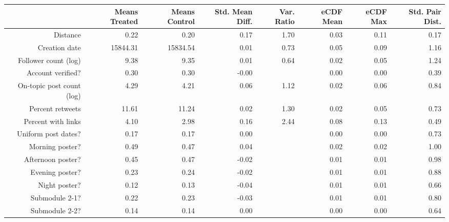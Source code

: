 \begin{table}[ht]
\centering
\begin{tabular}{rrrrrrrr}
  & Means Treated & Means Control & Std. Mean Diff. & Var. Ratio & eCDF Mean & eCDF Max & Std. Pair Dist. \\ 
  \hline
Distance & 0.22 & 0.20 & 0.17 & 1.70 & 0.03 & 0.11 & 0.17 \\ 
   \hline
Creation date & 15844.31 & 15834.54 & 0.01 & 0.73 & 0.05 & 0.09 & 1.16 \\ 
   \hline
Follower count (log) & 9.38 & 9.35 & 0.01 & 0.64 & 0.02 & 0.05 & 1.24 \\ 
   \hline
Account verified? & 0.30 & 0.30 & -0.00 &  & 0.00 & 0.00 & 0.39 \\ 
   \hline
On-topic post count (log) & 4.29 & 4.21 & 0.06 & 1.12 & 0.02 & 0.06 & 0.84 \\ 
   \hline
Percent retweets & 11.61 & 11.24 & 0.02 & 1.30 & 0.02 & 0.05 & 0.73 \\ 
   \hline
Percent with links & 4.10 & 2.98 & 0.16 & 2.44 & 0.08 & 0.13 & 0.49 \\ 
   \hline
Uniform post dates? & 0.17 & 0.17 & 0.00 &  & 0.00 & 0.00 & 0.73 \\ 
   \hline
Morning poster? & 0.49 & 0.47 & 0.04 &  & 0.02 & 0.02 & 1.00 \\ 
   \hline
Afternoon poster? & 0.45 & 0.47 & -0.02 &  & 0.01 & 0.01 & 0.98 \\ 
   \hline
Evening poster? & 0.23 & 0.24 & -0.02 &  & 0.01 & 0.01 & 0.88 \\ 
   \hline
Night poster? & 0.12 & 0.13 & -0.04 &  & 0.01 & 0.01 & 0.66 \\ 
   \hline
Submodule 2-1? & 0.22 & 0.23 & -0.03 &  & 0.01 & 0.01 & 0.80 \\ 
   \hline
Submodule 2-2? & 0.14 & 0.14 & 0.00 &  & 0.00 & 0.00 & 0.64 \\ 
   \hline
\end{tabular}
\end{table}
